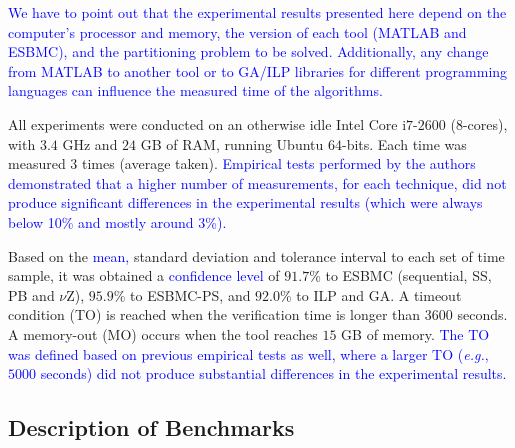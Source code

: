 \documentclass{doublecol-new}
\theoremstyle{TH}{
\newtheorem{lemma}{Lemma}
\newtheorem{theorem}[lemma]{Theorem}
\newtheorem{corrolary}[lemma]{Corrolary}
\newtheorem{conjecture}[lemma]{Conjecture}
\newtheorem{proposition}[lemma]{Proposition}
\newtheorem{claim}[lemma]{Claim}
\newtheorem{stheorem}[lemma]{Wrong Theorem}
\newtheorem{algorithm}{Algorithm}
}
\theoremstyle{THrm}{
\newtheorem{definition}{Definition}[section]
\newtheorem{question}{Question}[section]
\newtheorem{remark}{Remark}
\newtheorem{scheme}{Scheme}
}
\theoremstyle{THhit}{
\newtheorem{case}{Case}[section]
}
\begin{document}
\textcolor{blue}{We have to point out that the experimental results presented here depend on the computer's processor and memory, the version of each tool (MATLAB and ESBMC), and the partitioning problem to be solved. Additionally, any change from MATLAB to another tool or to GA/ILP libraries for different programming languages can influence the measured time of the algorithms.}

All experiments were conducted on an otherwise idle Intel Core i$7$-$2600$ ($8$-cores), with $3$.$4$ GHz and $24$ GB of RAM, running Ubuntu $64$-bits. Each time was measured $3$ times (average taken). \textcolor{blue}{Empirical tests performed by the authors demonstrated that a higher number of measurements, for each technique, did not produce significant differences in the experimental results (which were always below 10\% and mostly around 3\%).}

Based on the \textcolor{blue}{mean,} standard deviation and tolerance interval to each set of time sample, it was obtained a \textcolor{blue}{confidence level} of $91.7$\% to ESBMC (sequential, SS, PB and $\nu$Z), $95.9$\% to ESBMC-PS, and $92.0$\% to ILP and GA. A timeout condition (TO) is reached when the verification time is longer than $3600$ seconds. A memory-out (MO) occurs when the tool reaches $15$ GB of memory. \textcolor{blue}{The TO was defined based on previous empirical tests as well, where a larger TO ({\it e.g.}, $5000$ seconds) did not produce substantial differences in the experimental results.} 

\subsection{Description of Benchmarks}
\label{Benchmarks-Description}
\end{document}
